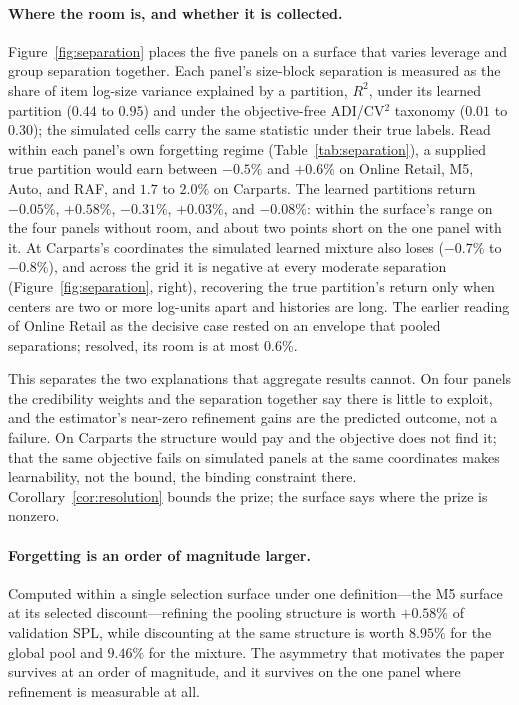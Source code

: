 \paragraph{Where the room is, and whether it is collected.}
Figure~\ref{fig:separation} places the five panels on a surface that
varies leverage and group separation together. Each panel's size-block
separation is measured as the share of item log-size variance explained
by a partition, $R^2$, under its learned partition ($0.44$ to $0.95$) and
under the objective-free ADI/CV$^2$ taxonomy ($0.01$ to $0.30$); the
simulated cells carry the same statistic under their true labels. Read
within each panel's own forgetting regime (Table~\ref{tab:separation}), a
supplied true partition would earn between $-0.5\%$ and $+0.6\%$ on
Online Retail, M5, Auto, and RAF, and $1.7$ to $2.0\%$ on Carparts. The
learned partitions return $-0.05\%$, $+0.58\%$, $-0.31\%$, $+0.03\%$, and
$-0.08\%$: within the surface's range on the four panels without room,
and about two points short on the one panel with it. At Carparts's
coordinates the simulated learned mixture also loses ($-0.7\%$ to $-0.8\%$), and across the grid it is negative at every moderate
separation (Figure~\ref{fig:separation}, right), recovering the true
partition's return only when centers are two or more log-units apart and
histories are long. The earlier reading of Online Retail as the decisive
case rested on an envelope that pooled separations; resolved, its room is
at most $0.6\%$.

This separates the two explanations that aggregate results cannot. On
four panels the credibility weights and the separation together say there
is little to exploit, and the estimator's near-zero refinement gains are
the predicted outcome, not a failure. On Carparts the structure would pay
and the objective does not find it; that the same objective fails on
simulated panels at the same coordinates makes learnability, not the
bound, the binding constraint there. Corollary~\ref{cor:resolution}
bounds the prize; the surface says where the prize is nonzero.

\paragraph{Forgetting is an order of magnitude larger.}
Computed within a single selection surface under one definition---the
M5 surface at its selected discount---refining the pooling
structure is worth $+0.58\%$ of validation SPL, while discounting at the
same structure is worth $8.95\%$ for the global pool and $9.46\%$ for the
mixture. The asymmetry that motivates the paper survives at an order of
magnitude, and it survives on the one panel where refinement is
measurable at all.

